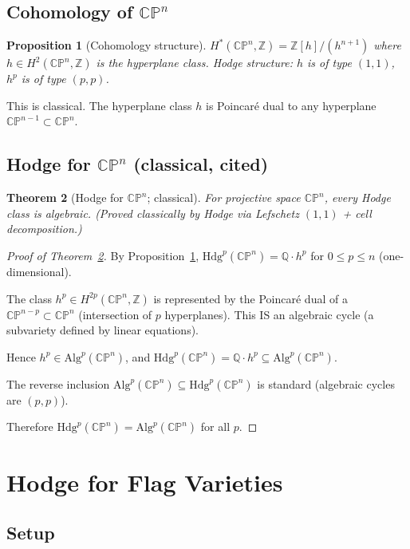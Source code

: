 \documentclass[11pt, a4paper]{amsart}
\newtheorem{theorem}{Theorem}[section]
\newtheorem{proposition}[theorem]{Proposition}
\theoremstyle{definition}
\newcommand{\Q}{\mathbb{Q}}
\newcommand{\Z}{\mathbb{Z}}
\newcommand{\CP}{\mathbb{CP}}
\begin{document}
\subsection{Cohomology of $\CP^n$}

\begin{proposition}[Cohomology structure]\label{prop:CPncohom}
$H^*(\CP^n, \Z) = \Z[h]/(h^{n+1})$ where $h \in H^2(\CP^n, \Z)$ is the
hyperplane class. Hodge structure: $h$ is of type $(1, 1)$, $h^p$ is
of type $(p, p)$.
\end{proposition}

This is classical. The hyperplane class $h$ is Poincaré dual to any
hyperplane $\CP^{n-1} \subset \CP^n$.

\subsection{Hodge for $\CP^n$ (classical, cited)}

\begin{theorem}[Hodge for $\CP^n$; classical]\label{thm:CPn}
For projective space $\CP^n$, every Hodge class is algebraic. (Proved classically by Hodge \cite{Hodge1941} via Lefschetz $(1,1)$ + cell decomposition.)
\end{theorem}

\begin{proof}[Proof of Theorem~\ref{thm:CPn}]
By Proposition~\ref{prop:CPncohom}, $\mathrm{Hdg}^p(\CP^n) = \Q \cdot h^p$
for $0 \leq p \leq n$ (one-dimensional).

The class $h^p \in H^{2p}(\CP^n, \Z)$ is represented by the Poincaré
dual of a $\CP^{n-p} \subset \CP^n$ (intersection of $p$ hyperplanes).
This IS an algebraic cycle (a subvariety defined by linear
equations).

Hence $h^p \in \mathrm{Alg}^p(\CP^n)$, and
$\mathrm{Hdg}^p(\CP^n) = \Q \cdot h^p \subseteq \mathrm{Alg}^p(\CP^n)$.

The reverse inclusion $\mathrm{Alg}^p(\CP^n) \subseteq \mathrm{Hdg}^p(\CP^n)$
is standard (algebraic cycles are $(p,p)$).

Therefore $\mathrm{Hdg}^p(\CP^n) = \mathrm{Alg}^p(\CP^n)$ for all $p$.
\end{proof}

\section{Hodge for Flag Varieties}\label{sec:flag}

\subsection{Setup}
\end{document}
